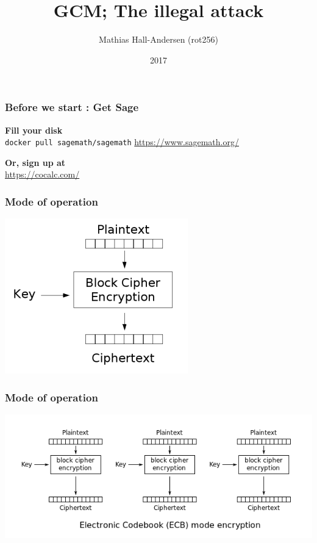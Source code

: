 \documentclass{beamer}
\title{GCM; The illegal attack}
\author{Mathias Hall-Andersen (rot256)}
\institute{Pwnies @ Copenhagen University}
\date{2017}
\begin{document}
\frame{\titlepage}

\begin{frame}
\frametitle{Before we start : Get Sage}

\textbf{Fill your disk} \\
\texttt{docker pull sagemath/sagemath}
\url{https://www.sagemath.org/}

\vspace{3mm}

\textbf{Or, sign up at} \\
\url{https://cocalc.com/}

\end{frame}

\begin{frame}
\frametitle{Mode of operation}
\begin{center}
\includegraphics[height=0.5\textheight]{block_cipher.png}
\end{center}
\end{frame}

\begin{frame}
\frametitle{Mode of operation}
\begin{center}
\includegraphics[width=\textwidth]{mode-ecb.png}
\end{center}
\end{frame}
\end{document}
